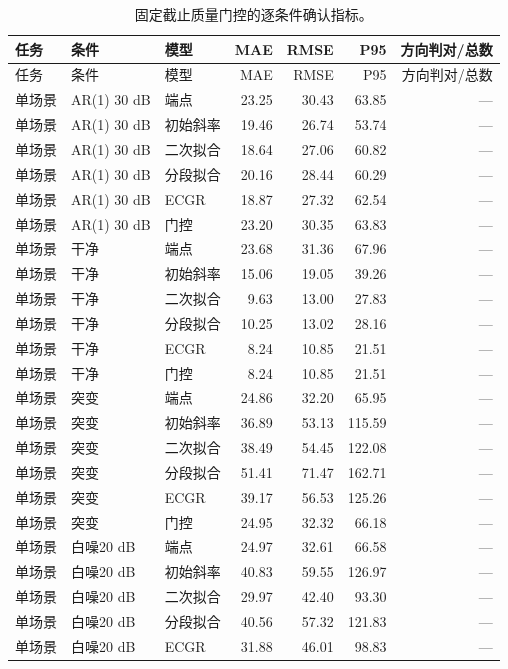 \small
\begin{longtable}{lllrrrr}
\caption{固定截止质量门控的逐条件确认指标。}\\
\toprule
任务 & 条件 & 模型 & MAE & RMSE & P95 & 方向判对/总数 \\
\midrule
\endfirsthead
\toprule
任务 & 条件 & 模型 & MAE & RMSE & P95 & 方向判对/总数 \\
\midrule
\endhead
单场景 & AR(1) 30 dB & 端点 & 23.25 & 30.43 & 63.85 & — \\
单场景 & AR(1) 30 dB & 初始斜率 & 19.46 & 26.74 & 53.74 & — \\
单场景 & AR(1) 30 dB & 二次拟合 & 18.64 & 27.06 & 60.82 & — \\
单场景 & AR(1) 30 dB & 分段拟合 & 20.16 & 28.44 & 60.29 & — \\
单场景 & AR(1) 30 dB & ECGR & 18.87 & 27.32 & 62.54 & — \\
单场景 & AR(1) 30 dB & 门控 & 23.20 & 30.35 & 63.83 & — \\
单场景 & 干净 & 端点 & 23.68 & 31.36 & 67.96 & — \\
单场景 & 干净 & 初始斜率 & 15.06 & 19.05 & 39.26 & — \\
单场景 & 干净 & 二次拟合 & 9.63 & 13.00 & 27.83 & — \\
单场景 & 干净 & 分段拟合 & 10.25 & 13.02 & 28.16 & — \\
单场景 & 干净 & ECGR & 8.24 & 10.85 & 21.51 & — \\
单场景 & 干净 & 门控 & 8.24 & 10.85 & 21.51 & — \\
单场景 & 突变 & 端点 & 24.86 & 32.20 & 65.95 & — \\
单场景 & 突变 & 初始斜率 & 36.89 & 53.13 & 115.59 & — \\
单场景 & 突变 & 二次拟合 & 38.49 & 54.45 & 122.08 & — \\
单场景 & 突变 & 分段拟合 & 51.41 & 71.47 & 162.71 & — \\
单场景 & 突变 & ECGR & 39.17 & 56.53 & 125.26 & — \\
单场景 & 突变 & 门控 & 24.95 & 32.32 & 66.18 & — \\
单场景 & 白噪20 dB & 端点 & 24.97 & 32.61 & 66.58 & — \\
单场景 & 白噪20 dB & 初始斜率 & 40.83 & 59.55 & 126.97 & — \\
单场景 & 白噪20 dB & 二次拟合 & 29.97 & 42.40 & 93.30 & — \\
单场景 & 白噪20 dB & 分段拟合 & 40.56 & 57.32 & 121.83 & — \\
单场景 & 白噪20 dB & ECGR & 31.88 & 46.01 & 98.83 & — \\

\end{longtable}
